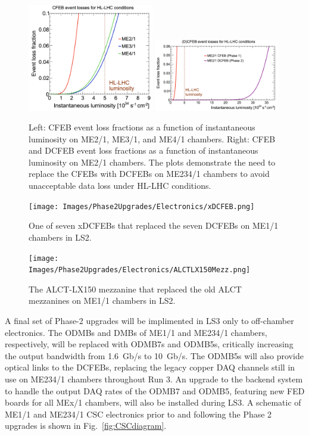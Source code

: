 \begin{figure}[H]
    \centering
    \includegraphics[width=0.49\textwidth]{Images/Phase2Upgrades/Electronics/CFEBeventlosses.png}
    \includegraphics[width=0.49\textwidth]{Images/Phase2Upgrades/Electronics/DCFEBenetlosses.png}
    \caption{Left: CFEB event loss fractions as a function of instantaneous luminosity on ME2/1, ME3/1, and ME4/1 chambers. Right: CFEB and DCFEB event loss fractions as a function of instantaneous luminosity on ME2/1 chambers. The plots demonstrate the need to replace the CFEBs with DCFEBs on ME234/1 chambers to avoid unacceptable data loss under HL-LHC conditions.}
    \label{fig:EventLosses}
\end{figure}

\begin{figure}[H]
    \centering
    \texttt{[image: Images/Phase2Upgrades/Electronics/xDCFEB.png]}
    \caption{One of seven xDCFEBs that replaced the seven DCFEBs on ME1/1 chambers in LS2.}
    \label{fig:xDCFEB}
\end{figure}

\begin{figure}[H]
    \centering
    \texttt{[image: Images/Phase2Upgrades/Electronics/ALCTLX150Mezz.png]}
    \caption{The ALCT-LX150 mezzanine that replaced the old ALCT mezzanines on ME1/1 chambers in LS2.}
    \label{fig:ALCT}
\end{figure}


A final set of Phase-2 upgrades will be implimented in LS3 only to off-chamber electronics. The ODMBs and DMBs of ME1/1 and ME234/1 chambers, respectively, will be replaced with ODMB7s and ODMB5s, critically increasing the output bandwidth from \SI{1.6}{Gb/s} to \SI{10}{Gb/s}. The ODMB5s will also provide optical links to the DCFEBs, replacing the legacy copper DAQ channels still in use on ME234/1 chambers throughout Run 3. An upgrade to the backend system to handle the output DAQ rates of the ODMB7 and ODMB5, featuring new FED boards for all MEx/1 chambers, will also be installed during LS3. A schematic of ME1/1 and ME234/1 CSC electronics prior to and following the Phase 2 upgrades is shown in Fig.~\ref{fig:CSCdiagram}.

